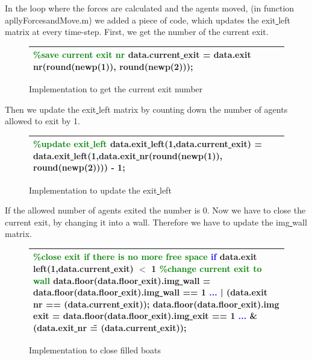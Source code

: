 \documentclass[11pt]{article}
\begin{document}
\bigskip
In the loop where the forces are calculated and the agents moved, (in function apllyForcesandMove.m) we added a piece of code, which updates the exit\underline{ }left matrix at every time-step.
\newline
First, we get the number of the current exit.

\begin{figure}[h!]
\centering
\begin{tabular}
{|>{\large}m{\textwidth}|} \hline
\bigskip
\textcolor{green}{\%save current exit nr}
\newline
data.current\underline{ }exit = data.exit\underline{ }nr(round(newp(1)), round(newp(2)));
\bigskip
\\ \hline
\end{tabular}
\caption{Implementation to get the current exit number}
\end{figure}

Then we update the exit\underline{ }left matrix by counting down the number of agents allowed to exit by 1. 

\begin{figure}[h!]
\centering
\begin{tabular}
{|>{\large}m{\textwidth}|} \hline
\bigskip
\textcolor{green}{\%update exit\underline{ }left}
\newline
data.exit\underline{ }left(1,data.current\underline{ }exit) = data.exit\underline{ }left(1,data.exit\underline{ }nr(round(newp(1)), round(newp(2)))) - 1;
\bigskip
\\ \hline
\end{tabular}
\caption{Implementation to update the exit\underline{ }left}
\end{figure}

If the allowed number of agents exited the number is 0. Now we have to close the current exit, by changing it into a wall. Therefore we have to update the img\underline{ }wall matrix.

\begin{figure}[h!]
\centering
\begin{tabular}
{|>{\large}m{\textwidth}|} \hline
\bigskip
\textcolor{green}{\%close exit if there is no more free space}
\newline
\textcolor{blue}{if} data.exit\underline{ } left(1,data.current\underline{ }exit) $<$ 1
\newline
\textcolor{green}{\%change current exit to wall}
\newline
data.floor(data.floor\underline{ }exit).img\underline{ }wall = data.floor(data.floor\underline{ }exit).img\underline{ }wall == 1 \textcolor{blue}{...}
\newline
| (data.exit\underline{ }nr == (data.current\underline{ }exit));
\newline
data.floor(data.floor\underline{ }exit).img\underline{ }exit = data.floor(data.floor\underline{ }exit).img\underline{ }exit == 1 \textcolor{blue}{...}
\newline
\& (data.exit\underline{ }nr \~ = (data.current\underline{ }exit));
\bigskip
\\ \hline
\end{tabular}
\caption{Implementation to close filled  boats}
\end{figure}
\end{document}
